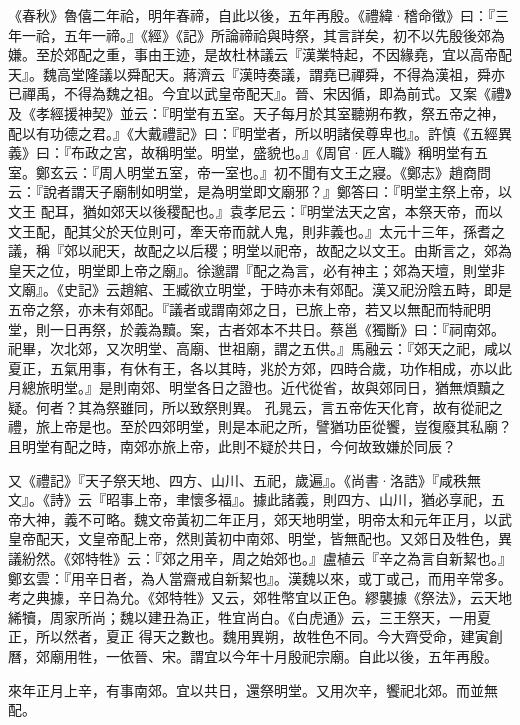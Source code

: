 \begin{pinyinscope}
 《春秋》魯僖二年祫，明年春禘，自此以後，五年再殷。《禮緯·稽命徵》曰：『三年一祫，五年一禘。』《經》《記》所論禘祫與時祭，其言詳矣，初不以先殷後郊為嫌。至於郊配之重，事由王迹，是故杜林議云『漢業特起，不因緣堯，宜以高帝配天』。魏高堂隆議以舜配天。蔣濟云『漢時奏議，謂堯已禪舜，不得為漢祖，舜亦已禪禹，不得為魏之祖。今宜以武皇帝配天』。晉、宋因循，即為前式。又案《禮》及《孝經援神契》並云：『明堂有五室。天子每月於其室聽朔布教，祭五帝之神，配以有功德之君。』《大戴禮記》曰：『明堂者，所以明諸侯尊卑也』。許慎《五經異義》曰：『布政之宮，故稱明堂。明堂，盛貌也。』《周官·匠人職》稱明堂有五室。鄭玄云：『周人明堂五室，帝一室也。』初不聞有文王之寢。《鄭志》趙商問云：『說者謂天子廟制如明堂，是為明堂即文廟邪？』鄭答曰：『明堂主祭上帝，以文王
 配耳，猶如郊天以後稷配也。』袁孝尼云：『明堂法天之宮，本祭天帝，而以文王配，配其父於天位則可，牽天帝而就人鬼，則非義也。』太元十三年，孫耆之議，稱『郊以祀天，故配之以后稷；明堂以祀帝，故配之以文王。由斯言之，郊為皇天之位，明堂即上帝之廟』。徐邈謂『配之為言，必有神主；郊為天壇，則堂非文廟』。《史記》云趙綰、王臧欲立明堂，于時亦未有郊配。漢又祀汾陰五畤，即是五帝之祭，亦未有郊配。『議者或謂南郊之日，已旅上帝，若又以無配而特祀明堂，則一日再祭，於義為黷。案，古者郊本不共日。蔡邕《獨斷》曰：『祠南郊。祀畢，次北郊，又次明堂、高廟、世祖廟，謂之五供。』馬融云：『郊天之祀，咸以夏正，五氣用事，有休有王，各以其時，兆於方郊，四時合歲，功作相成，亦以此月總旅明堂。』是則南郊、明堂各日之證也。近代從省，故與郊同日，猶無煩黷之疑。何者？其為祭雖同，所以致祭則異。
 孔晁云，言五帝佐天化育，故有從祀之禮，旅上帝是也。至於四郊明堂，則是本祀之所，譬猶功臣從饗，豈復廢其私廟？且明堂有配之時，南郊亦旅上帝，此則不疑於共日，今何故致嫌於同辰？



 又《禮記》『天子祭天地、四方、山川、五祀，歲遍』。《尚書·洛誥》『咸秩無文』。《詩》云『昭事上帝，聿懷多福』。據此諸義，則四方、山川，猶必享祀，五帝大神，義不可略。魏文帝黃初二年正月，郊天地明堂，明帝太和元年正月，以武皇帝配天，文皇帝配上帝，然則黃初中南郊、明堂，皆無配也。又郊日及牲色，異議紛然。《郊特牲》云：『郊之用辛，周之始郊也。』盧植云『辛之為言自新絜也。』鄭玄雲：『用辛日者，為人當齋戒自新絜也』。漢魏以來，或丁或己，而用辛常多。考之典據，辛日為允。《郊特牲》又云，郊牲幣宜以正色。繆襲據《祭法》，云天地絺犢，周家所尚；魏以建丑為正，牲宜尚白。《白虎通》云，三王祭天，一用夏正，所以然者，夏正
 得天之數也。魏用異朔，故牲色不同。今大齊受命，建寅創曆，郊廟用牲，一依晉、宋。謂宜以今年十月殷祀宗廟。自此以後，五年再殷。



 來年正月上辛，有事南郊。宜以共日，還祭明堂。又用次辛，饗祀北郊。而並無配。




\end{pinyinscope}
